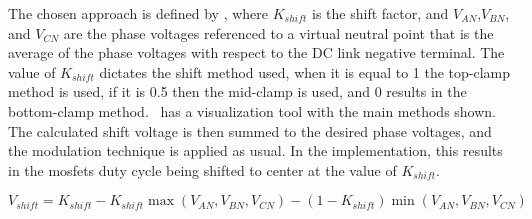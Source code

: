 The chosen approach is defined by , where $K_{shift}$ is the shift factor, and $V_{AN}$,$V_{BN}$, and $V_{CN}$ are the phase voltages referenced to a virtual neutral point that is the average of the phase voltages with respect to the DC link negative terminal. The value of $K_{shift}$ dictates the shift method used, when it is equal to 1 the top-clamp method is used, if it is 0.5 then the mid-clamp is used, and 0 results in the bottom-clamp method.~\citet{Microchip:ZSM_viewer:2023} has a visualization tool with the main methods shown. The calculated shift voltage is then summed to the desired phase voltages, and the modulation technique is applied as usual. In the implementation, this results in the \glspl{mosfet} duty cycle being shifted to center at the value of $K_{shift}$.

\begin{equation}
	V_{shift} = K_{shift} - K_{shift} \max \left(V_{AN},V_{BN},V_{CN}\right) - (1-K_{shift}) \min \left(V_{AN},V_{BN},V_{CN}\right)
	\label{eq:neutral_point_shift}
\end{equation}
